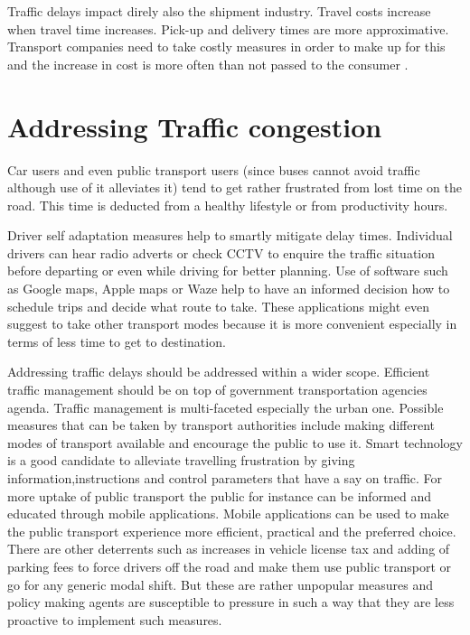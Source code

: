 \documentclass[12pt, a4paper]{report}
\theoremstyle{definition}
\theoremstyle{definition}%
\theoremstyle{definition}%
\theoremstyle{definition}%
\theoremstyle{definition}%
\theoremstyle{definition}%
\begin{document}
Traffic delays impact direly also the shipment industry. Travel costs increase when travel time increases.  Pick-up and delivery times are more approximative. Transport companies need to take costly measures in order to make up for this and the increase in cost is more often than not passed to the consumer  \cite{Schrank.2015} \cite{CambridgeSystematicsInc.2005}.

\section{Addressing Traffic congestion} \label{section:introduction:addressing_traffic_congestion}

Car users and even public transport users (since buses cannot avoid traffic although use of it alleviates it) tend to get rather frustrated from lost time on the road. This time is deducted from a healthy lifestyle or from productivity hours. 

Driver self adaptation measures help to smartly mitigate delay times. Individual drivers can hear radio adverts or check CCTV to enquire the traffic situation before departing or even while driving for better planning. Use of software such as Google maps, Apple maps or Waze help to have an informed decision how to schedule trips and decide what route to take.  These applications might even suggest to take other transport modes because it is more convenient especially in terms of less time to get to destination.

Addressing traffic delays should be addressed within a wider scope. Efficient traffic management should be on top of government transportation agencies agenda. Traffic management is multi-faceted especially the urban one. Possible measures that can be taken by transport authorities include making different modes of transport available and encourage the public to use it. Smart technology is a good candidate to alleviate travelling frustration by giving information,instructions and control parameters that have a say on traffic. For more uptake of public transport the public for instance can be informed and educated through mobile applications.  Mobile applications can be used to make the public transport experience more efficient, practical and the preferred choice. There are other deterrents such as increases in vehicle license tax and adding of parking fees to force drivers off the road and make them use public transport or go for any generic modal shift. But these are rather unpopular measures and policy making agents are susceptible to pressure in such a way that they are less proactive to implement such measures.
\end{document}
